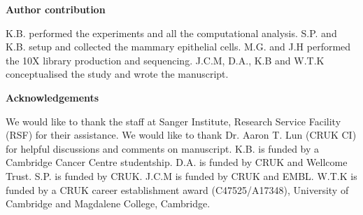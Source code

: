 \documentclass[titlepage, 12pt, oneside]{amsart}
\begin{document}
\textbf{Author contribution}

K.B. performed the experiments and all the computational analysis.
S.P. and K.B. setup and collected the mammary epithelial cells.
M.G. and J.H performed the 10X library production and sequencing.
J.C.M, D.A., K.B and W.T.K conceptualised the study and wrote the manuscript.

\textbf{Acknowledgements }

We would like to thank the staff at Sanger Institute, Research Service Facility (RSF) for their assistance.
We would like to thank Dr. Aaron T. Lun (CRUK CI) for helpful discussions and comments on manuscript.
K.B. is funded by a Cambridge Cancer Centre studentship.
D.A. is funded by CRUK and Wellcome Trust.
S.P. is funded by CRUK.
J.C.M is funded by CRUK and EMBL.
W.T.K is funded by a CRUK career establishment award (C47525/A17348), University of Cambridge and Magdalene College, Cambridge.

\printbibliography
\end{document}
